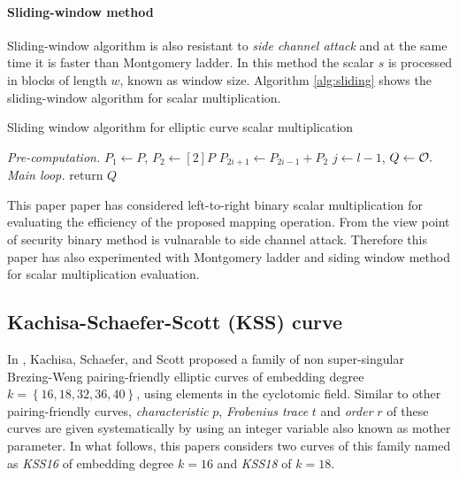 \paragraph{Sliding-window method}
Sliding-window \cite{DBLP:reference/crc/2005ehcc} algorithm is also resistant to \textit{side channel attack} and at the same  time it is faster than Montgomery ladder. In this method the scalar $s$ is processed in blocks of length $w$, known as window size.  Algorithm \ref{alg:sliding} shows the sliding-window algorithm for scalar multiplication.
 \begin{algorithm}
  \caption{Sliding window algorithm for elliptic curve scalar multiplication}
  \label{alg:sliding}
  \DontPrintSemicolon
  \hspace{-3ex}
   \;
  \hspace{-3ex}
   \;
  \textit{Pre-computation.} \; 
  \nl $P_1\leftarrow P$, $P_2 \leftarrow [2]P$ \;
  \nl {} { $P_{2i+1} \leftarrow P_{2i-1} + P_2$}\;
  \nl $j \leftarrow l-1$, $Q \leftarrow \cal{O}.$\;
  \textit{Main loop.}\;
   \nl {} {\;
    \nl {}
\nl            {}
            }
 \nl return $Q$
\end{algorithm}

This paper paper has considered left-to-right binary scalar multiplication for evaluating the efficiency of the proposed mapping operation. From the view point of security binary method is vulnarable to side channel attack. Therefore this paper has also experimented with Montgomery ladder \cite{Silverman} and siding window method for scalar multiplication evaluation.

\subsection{Kachisa-Schaefer-Scott (KSS) curve \cite{EPRINT:KacSchSco07}}
 In \cite{EPRINT:KacSchSco07}, Kachisa, Schaefer, and Scott proposed a family of non super-singular Brezing-Weng pairing-friendly elliptic curves of embedding degree $k = \left\lbrace16, 18, 32, 36, 40\right\rbrace$, using elements in the cyclotomic field. Similar to other pairing-friendly curves,  \textit{characteristic} $p$, \textit{Frobenius trace} $t$ and \textit{order} $r$ of these curves are given systematically by using an integer variable also known as mother parameter. In what follows, this papers considers two curves of this family named as \textit{KSS16} of embedding degree $k =16$  and \textit{KSS18} of $k=18$. 

